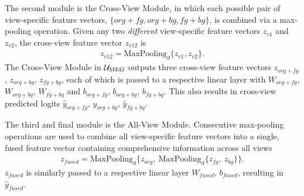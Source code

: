 The second module is the Cross-View Module, in which each possible pair of view-specific feature vectors, $\{org+fg, org+bg, fg+bg\}$, is combined via a max-pooling operation. Given any two \emph{different} view-specific feature vectors $z_{v1}$ and $z_{v2}$, the cross-view feature vector $z_{v12}$ is
\begin{equation}
\begin{aligned}
    z_{v12} = \text{MaxPooling}_{d} \{z_{v1}, z_{v2}\}.
\end{aligned}
\end{equation}
The Cross-View Module in $\mathcal{U}_{\text{MEO}}$ outputs three cross-view feature vectors $z_{org+fg}$, $z_{org+bg}$, $z_{fg+bg}$, each of which is passed to a respective linear layer with $W_{org+fg}$, $W_{org+bg}$, $W_{fg+bg}$ and $b_{org+fg}$, $b_{org+bg}$, $b_{fg+bg}$. This also results in cross-view predicted logits $\hat{y}_{org+fg}$, $\hat{y}_{org+bg}$, $\hat{y}_{fg+bg}$.

The third and final module is the All-View Module. Consecutive max-pooling operations are used to combine all view-specific feature vectors into a single, fused feature vector containing comprehensive information across all views
\begin{equation}
\begin{aligned}
    z_{fused} = \text{MaxPooling}_{d}\{z_{org},~\text{MaxPooling}_{d}\{z_{fg},~z_{bg}\}\}.
\end{aligned}
\end{equation}
$z_{fused}$ is similarly passed to a respective linear layer $W_{fused}$, $b_{fused}$, resulting in $\hat{y}_{fused}$.

